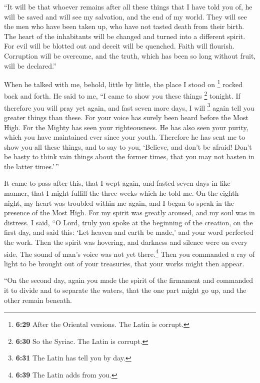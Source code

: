  ``It will be that whoever remains after all these things
that I have told you of, he will be saved and will see my salvation, and
the end of my world.  They will see the men who have been
taken up, who have not tasted death from their birth. The heart of the
inhabitants will be changed and turned into a different spirit.
 For evil will be blotted out and deceit will be
quenched.  Faith will flourish. Corruption will be
overcome, and the truth, which has been so long without fruit, will be
declared.''

 When he talked with me, behold, little by little, the
place I stood on \footnote{\textbf{6:29} After the Oriental versions.
  The Latin is corrupt.} rocked back and forth.  He said
to me, ``I came to show you these things \footnote{\textbf{6:30} So the
  Syriac. The Latin is corrupt.} tonight.  If therefore
you will pray yet again, and fast seven more days, I will \footnote{\textbf{6:31}
  The Latin has tell you by day.} again tell you greater things than
these.  For your voice has surely been heard before the
Most High. For the Mighty has seen your righteousness. He has also seen
your purity, which you have maintained ever since your youth.
 Therefore he has sent me to show you all these things,
and to say to you, `Believe, and don't be afraid!  Don't
be hasty to think vain things about the former times, that you may not
hasten in the latter times.'\,''

 It came to pass after this, that I wept again, and
fasted seven days in like manner, that I might fulfill the three weeks
which he told me.  On the eighth night, my heart was
troubled within me again, and I began to speak in the presence of the
Most High.  For my spirit was greatly aroused, and my
soul was in distress.  I said, ``O Lord, truly you spoke
at the beginning of the creation, on the first day, and said this: `Let
heaven and earth be made,' and your word perfected the work.
 Then the spirit was hovering, and darkness and silence
were on every side. The sound of man's voice was not yet
there.\footnote{\textbf{6:39} The Latin adds from you.} 
Then you commanded a ray of light to be brought out of your treasuries,
that your works might then appear.

 ``On the second day, again you made the spirit of the
firmament and commanded it to divide and to separate the waters, that
the one part might go up, and the other remain beneath.

